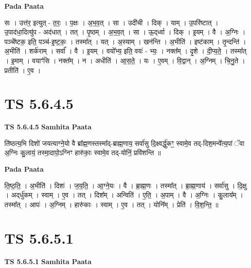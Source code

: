 \documentclass[17pt]{extarticle}
\begin{document}
\textbf{Pada Paata} \newline

सः । उत्त॑र॒ इत्युत् - त॒रः॒ । प॒क्षः । अ॒भ॒व॒त् । सा । उदी॑ची । दिक् । याम् । उ॒परि॑ष्टात् । उ॒पाद॑धा॒दित्यु॑प - अद॑धात् । तत् । पृ॒ष्ठम् । अ॒भ॒व॒त् । सा । ऊ॒द्‌र्ध्वा । दिक् । इ॒यम् । वै । अ॒ग्निः । पञ्चे᳚ष्टक॒ इति॒ पञ्च॑-इ॒ष्ट॒कः॒ । तस्मा᳚त् । यत् । अ॒स्याम् । खन॑न्ति । अ॒भीति॑ । इष्ट॑काम् । तृ॒न्दन्ति॑ । अ॒भीति॑ । शर्क॑राम् । सर्वा᳚ । वै । इ॒यम् । वयो᳚भ्य॒ इति॒ वयः॑ - भ्यः॒ । नक्त᳚म् । दृ॒शे । दी॒प्य॒ते॒ । तस्मा᳚त् । इ॒माम् । वयाꣳ॑सि । नक्त᳚म् । न । अधीति॑ । आ॒स॒ते॒ । यः । ए॒वम् । वि॒द्वान् । अ॒ग्निम् । चि॒नु॒ते । प्रतीति॑ । ए॒व ।  \newline





\section{ TS 5.6.4.5 }

\textbf{TS 5.6.4.5 } \newline
\textbf{Samhita Paata} \newline

ति॑ष्ठत्य॒भि दिशो॑ जयत्याग्ने॒यो वै ब्रा᳚ह्म॒णस्तस्मा᳚द्-ब्राह्म॒णाय॒ सर्वा॑सु दि॒क्ष्वर्द्धु॑कꣳ॒॒ स्वामे॒व तद्-दिश॒मन्वे᳚त्य॒पां ॅवा अ॒ग्निः कु॒लायं॒ तस्मा॒दापो॒ऽग्निꣳ हारु॑काः॒ स्वामे॒व तद्-योनिं॒ प्रवि॑शन्ति ॥ \newline

\textbf{Pada Paata} \newline

ति॒ष्ठ॒ति॒ । अ॒भीति॑ । दिशः॑ । ज॒य॒ति॒ । आ॒ग्ने॒यः । वै । ब्रा॒ह्म॒णः । तस्मा᳚त् । ब्रा॒ह्म॒णाय॑ । सर्वा॑सु । दि॒क्षु । अद्‌र्धु॑कम् । स्वाम् । ए॒व । तत् । दिश᳚म् । अन्विति॑ । ए॒ति॒ । अ॒पाम् । वै । अ॒ग्निः । कु॒लाय᳚म् । तस्मा᳚त् । आपः॑ । अ॒ग्निम् । हारु॑काः । स्वाम् । ए॒व । तत् । योनि᳚म् । प्रेति॑ । वि॒श॒न्ति॒ ॥  \newline





\section{ TS 5.6.5.1 }

\textbf{TS 5.6.5.1 } \newline
\textbf{Samhita Paata} \newline
\end{document}
